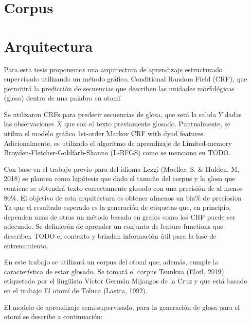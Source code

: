 \documentclass[letterpaper,12pt,oneside]{book}
\begin{document}
\section{Corpus}



\section{Arquitectura}

Para esta tesis proponemos una arquitectura de aprendizaje
estructurado  supervisado utilizando un método gráfico, Conditional
Random Field (CRF), que permitirá la predicción de secuencias que describen
las unidades morfológicas (glosa) dentro de una palabra en otomí

Se utilizaron CRFs para predecir secuencias de glosa, que será la salida $Y$
dadas las observaciones $X$ que son el texto previamente glosado. Puntualmente,
se utiliza el modelo gráfico 1st-order Markov CRF with dyad features.
Adicionalmente, es utilizado el algoritmo de aprendizaje de Limited-memory
Broyden-Fletcher-Goldfarb-Shanno (L-BFGS) como se menciono en TODO.

Con base en el trabajo previo para del idioma Lezgi (Moeller, S. \& Hulden, M, 2018) se plantea como hipótesis que dado el tamaño del corpus y la glosa que contiene
se obtendrá texto correctamente glosado con una precisión de al menos 80\%. El objetivo de esta arquitectura es obtener almenos un bla\% de preciosion
Ya que el resultado esperado es la generación de etiquetas que, en principio,
dependen unas de otras un método basado en grafos como los CRF puede ser
adecuado. Se definierón de aprender un conjunto de feature functions que
describen TODO el contexto y brindan información útil para la fase de
entrenamiento.

En este trabajo se utilizará un corpus del otomí que, además, cumple la
característica de estar glosado. Se tomará el corpus Tsunkua (Elotl, 2019)
etiquetado por el lingüista Víctor Germán Mijangos de la Cruz y que está basado
en el trabajo El otomí de Toluca (Lastra, 1992).

El modelo de aprendizaje semi-supervisado, para la generación de glosa para
el otomí se describe a continuación:
\end{document}
